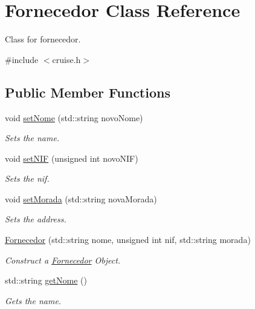 \hypertarget{classFornecedor}{}\section{Fornecedor Class Reference}
\label{classFornecedor}


Class for fornecedor.  




{\ttfamily \#include $<$cruise.\+h$>$}

\subsection*{Public Member Functions}
\begin{DoxyCompactItemize}
\item 
void \hyperlink{classFornecedor_a2f207b2242cf6ec5d76a3808dbb4fd80}{set\+Nome} (std\+::string novo\+Nome)
\begin{DoxyCompactList}\small\item\em Sets the name. \end{DoxyCompactList}\item 
void \hyperlink{classFornecedor_a9bbb88ef7aa281df4042aeedadcd510e}{set\+N\+IF} (unsigned int novo\+N\+IF)
\begin{DoxyCompactList}\small\item\em Sets the nif. \end{DoxyCompactList}\item 
void \hyperlink{classFornecedor_a240f4abc6ac49f030c93679b3628e222}{set\+Morada} (std\+::string nova\+Morada)
\begin{DoxyCompactList}\small\item\em Sets the address. \end{DoxyCompactList}\item 
\hyperlink{classFornecedor_a0cbc4556289cc946756039ab0da52756}{Fornecedor} (std\+::string nome, unsigned int nif, std\+::string morada)
\begin{DoxyCompactList}\small\item\em Construct a \hyperlink{classFornecedor}{Fornecedor} Object. \end{DoxyCompactList}\item 
std\+::string \hyperlink{classFornecedor_a8d14dd862259e29adef0e283f15cbb16}{get\+Nome} ()
\begin{DoxyCompactList}\small\item\em Gets the name. \end{DoxyCompactList}\item 

\end{DoxyCompactItemize}
